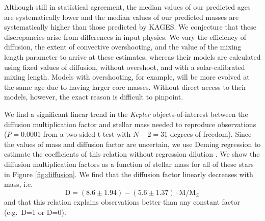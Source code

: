 \documentclass[twocolumn,twocolappendix]{aastex6}
\begin{document}
Although still in statistical agreement, the median values of our predicted ages are systematically lower and the median values of our predicted masses are systematically higher than those predicted by KAGES. We conjecture that these discrepancies arise from differences in input physics. We vary the efficiency of diffusion, the extent of convective overshooting, and the value of the mixing length parameter to arrive at these estimates, whereas their models are calculated using fixed values of diffusion, without overshoot, and with a solar-calibrated mixing length. Models with overshooting, for example, will be more evolved at the same age due to having larger core masses. Without direct access to their models, however, the exact reason is difficult to pinpoint. 

We find a significant linear trend in the \emph{Kepler} objects-of-interest between the diffusion multiplication factor and stellar mass needed to reproduce observations ($P = 0.0001$ from a two-sided t-test with $N-2=31$ degrees of freedom). Since the values of mass and diffusion factor are uncertain, we use Deming regression to estimate the coefficients of this relation without regression dilution \citep{deming1943statistical}. We show the diffusion multiplication factors as a function of stellar mass for all of these stars in Figure \ref{fig:diffusion}. We find that the diffusion factor linearly decreases with mass, i.e.\ 
\begin{equation} \label{eq:diffusion}
    \text{D} = ( 8.6 \pm 1.94 ) - ( 5.6 \pm 1.37 ) \cdot \text{M}/\text{M}_\odot
\end{equation}
and that this relation explains observations better than any constant factor (e.g.\ D=1 or D=0). 
\end{document}
